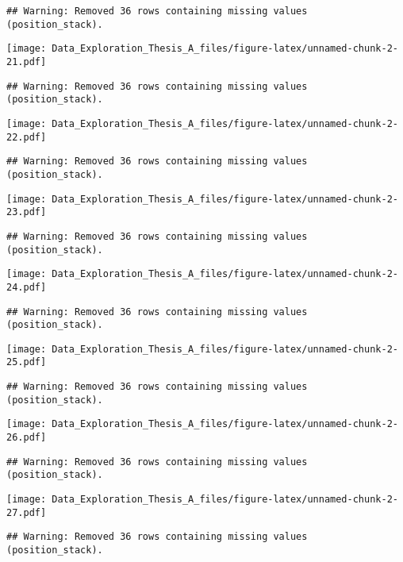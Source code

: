 \documentclass[]{article}
\begin{document}
\begin{verbatim}
## Warning: Removed 36 rows containing missing values (position_stack).
\end{verbatim}

\texttt{[image: Data\_Exploration\_Thesis\_A\_files/figure-latex/unnamed-chunk-2-21.pdf]}

\begin{verbatim}
## Warning: Removed 36 rows containing missing values (position_stack).
\end{verbatim}

\texttt{[image: Data\_Exploration\_Thesis\_A\_files/figure-latex/unnamed-chunk-2-22.pdf]}

\begin{verbatim}
## Warning: Removed 36 rows containing missing values (position_stack).
\end{verbatim}

\texttt{[image: Data\_Exploration\_Thesis\_A\_files/figure-latex/unnamed-chunk-2-23.pdf]}

\begin{verbatim}
## Warning: Removed 36 rows containing missing values (position_stack).
\end{verbatim}

\texttt{[image: Data\_Exploration\_Thesis\_A\_files/figure-latex/unnamed-chunk-2-24.pdf]}

\begin{verbatim}
## Warning: Removed 36 rows containing missing values (position_stack).
\end{verbatim}

\texttt{[image: Data\_Exploration\_Thesis\_A\_files/figure-latex/unnamed-chunk-2-25.pdf]}

\begin{verbatim}
## Warning: Removed 36 rows containing missing values (position_stack).
\end{verbatim}

\texttt{[image: Data\_Exploration\_Thesis\_A\_files/figure-latex/unnamed-chunk-2-26.pdf]}

\begin{verbatim}
## Warning: Removed 36 rows containing missing values (position_stack).
\end{verbatim}

\texttt{[image: Data\_Exploration\_Thesis\_A\_files/figure-latex/unnamed-chunk-2-27.pdf]}

\begin{verbatim}
## Warning: Removed 36 rows containing missing values (position_stack).
\end{verbatim}
\end{document}
